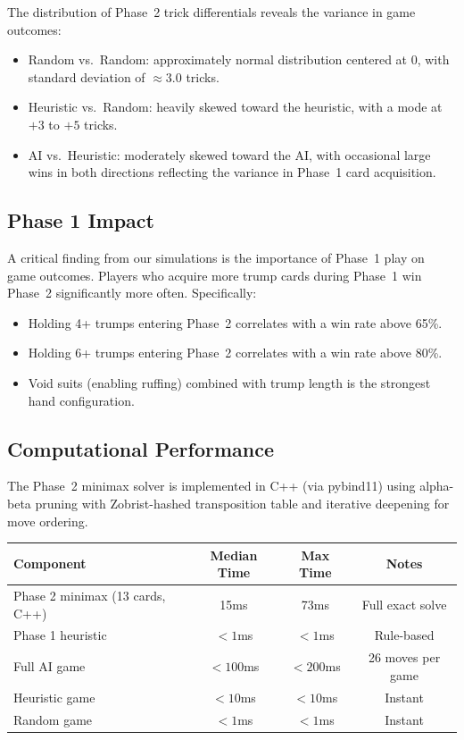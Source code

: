 The distribution of Phase~2 trick differentials reveals the variance in game
outcomes:
\begin{itemize}
  \item Random vs.\ Random: approximately normal distribution centered at 0,
    with standard deviation of $\approx 3.0$ tricks.
  \item Heuristic vs.\ Random: heavily skewed toward the heuristic, with a
    mode at $+3$ to $+5$ tricks.
  \item AI vs.\ Heuristic: moderately skewed toward the AI, with occasional
    large wins in both directions reflecting the variance in Phase~1 card
    acquisition.
\end{itemize}

\subsection{Phase 1 Impact}

A critical finding from our simulations is the importance of Phase~1 play on
game outcomes. Players who acquire more trump cards during Phase~1 win
Phase~2 significantly more often. Specifically:
\begin{itemize}
  \item Holding 4+ trumps entering Phase~2 correlates with a win rate above
    65\%.
  \item Holding 6+ trumps entering Phase~2 correlates with a win rate above
    80\%.
  \item Void suits (enabling ruffing) combined with trump length is the
    strongest hand configuration.
\end{itemize}

\subsection{Computational Performance}

The Phase~2 minimax solver is implemented in C++ (via pybind11) using
alpha-beta pruning with Zobrist-hashed transposition table and iterative
deepening for move ordering.

\begin{center}
\begin{tabular}{lccc}
\toprule
Component & Median Time & Max Time & Notes \\
\midrule
Phase 2 minimax (13 cards, C++) & 15ms & 73ms & Full exact solve \\
Phase 1 heuristic & $<1$ms & $<1$ms & Rule-based \\
Full AI game & $<100$ms & $<200$ms & 26 moves per game \\
Heuristic game & $<10$ms & $<10$ms & Instant \\
Random game & $<1$ms & $<1$ms & Instant \\
\bottomrule
\end{tabular}
\end{center}
